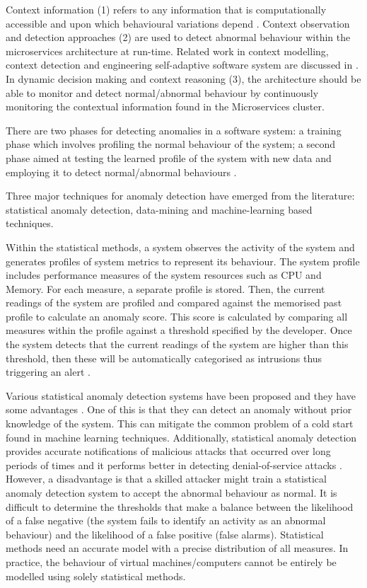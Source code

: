 \documentclass[sigconf]{acmart}
\begin{document}
Context information (1) refers to any information that is computationally accessible and upon which behavioural variations depend \cite{Hirschfeld:2008p1620}. Context observation and detection approaches (2) are used to detect abnormal behaviour within the microservices architecture at run-time. Related work in context modelling, context detection and engineering self-adaptive software system are discussed in \cite{Salehie:2009p3693,Cheng:2008p3708,RogeriodeLemos:2011tj,Strang:2004p3770}.  
In dynamic decision making and context reasoning (3), the architecture should be able to monitor and detect normal/abnormal behaviour by continuously monitoring the contextual information found in the Microservices cluster. 

There are two phases for detecting anomalies in a software system: a training phase which involves profiling the normal behaviour of the system; a second phase aimed at testing the learned profile of the system with new data and employing it to detect normal/abnormal behaviours \cite{Patcha:2007hja}. 

Three major techniques for anomaly detection have emerged from the literature: statistical anomaly detection, data-mining and machine-learning based techniques. 

Within the statistical methods, a system observes the activity of the system and generates profiles of  system metrics to represent its behaviour. The system profile includes performance measures of the system resources such as CPU and Memory. For each measure, a separate profile is stored. Then, the current readings of the system are profiled and compared against the memorised past profile to calculate an anomaly score. This score is calculated by comparing all measures within the profile against a threshold specified by the developer. Once the system detects that the current readings of the system  are higher than this threshold, then these will be automatically categorised as  intrusions thus triggering an alert \cite{kruegel2003anomaly}. 

Various statistical anomaly detection systems have been proposed and they have some advantages \cite{anderson1995next,roesch1999snort}. 
One of this is that they can detect an anomaly without prior knowledge of the system. This can mitigate the common problem of a cold start found in machine learning techniques. Additionally, statistical anomaly detection provides accurate notifications of malicious attacks that occurred over long periods of times and it performs better in detecting denial-of-service attacks \cite{Patcha:2007hja}. 
However, a disadvantage is that a skilled attacker might train a statistical anomaly detection system to accept the abnormal behaviour as normal. It is difficult to determine the thresholds that make a balance between the likelihood of a false negative (the system fails to identify an activity as an abnormal behaviour) and the likelihood of a false positive (false alarms). Statistical methods need an accurate  model with a precise distribution of all measures. In practice, the behaviour of virtual machines/computers cannot be entirely be modelled using solely statistical methods.
\end{document}
